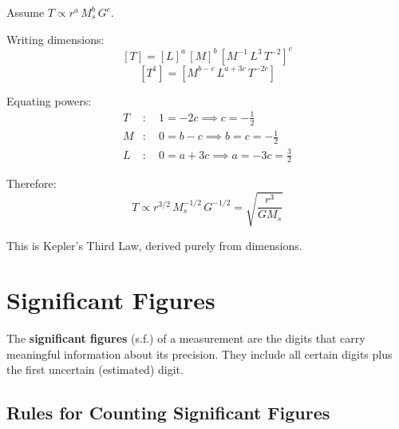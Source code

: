 \begin{solutionbox}
Assume $T \propto r^a\, M_s^b\, G^c$.

Writing dimensions:
\[
  [T] = [L]^a\,[M]^b\,[M^{-1}\,L^3\,T^{-2}]^c
\]
\[
  [T^1] = [M^{b-c}\,L^{a+3c}\,T^{-2c}]
\]

Equating powers:
\begin{align*}
  T&:\quad 1 = -2c \implies c = -\tfrac{1}{2}\\
  M&:\quad 0 = b - c \implies b = c = -\tfrac{1}{2}\\
  L&:\quad 0 = a + 3c \implies a = -3c = \tfrac{3}{2}
\end{align*}

Therefore:
\[
  T \propto r^{3/2}\,M_s^{-1/2}\,G^{-1/2}
  = \sqrt{\frac{r^3}{G M_s}}
\]

This is Kepler's Third Law, derived purely from dimensions.
\end{solutionbox}

\section{Significant Figures}
\label{sec:sig_figs}

\begin{definitionbox}
The \textbf{significant figures} (s.f.) of a measurement
are the digits that carry meaningful information about its
precision. They include all certain digits plus the first
uncertain (estimated) digit.
\end{definitionbox}

\subsection{Rules for Counting Significant Figures}

